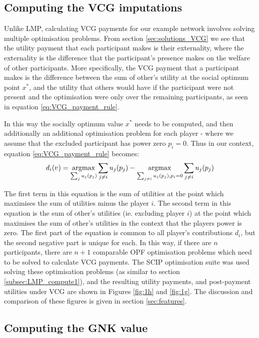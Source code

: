 \subsection{Computing the VCG imputations}\label{subsec:VCG_compute1}

Unlike LMP, calculating VCG payments for our example network involves solving multiple optimisation problems.
From section \ref{sec:solutions_VCG} we see that the utility payment that each participant makes is their externality, where the externality is the difference that the participant's presence makes on the welfare of other participants.
More specifically, the VCG payment that a participant makes is the difference between the sum of other's utility at the social optimum point $x^*$, and the utility that others would have if the participant were not present and the optimisation were only over the remaining participants, as seen in equation \ref{eq:VCG_payment_rule}.

In this way the socially optimum value $x^*$ needs to be computed, and then additionally an additional optimisation problem for each player - where we assume that the excluded participant has power zero $p_i=0$. Thus in our context, equation \ref{eq:VCG_payment_rule} becomes:
\begin{equation*} d_i(v)=\operatorname*{\arg\!\max}_{\sum_{j} u_j(p_j)}\sum_{j\ne i}u_j(p_j) - \operatorname*{\arg\!\max}_{\sum_{j\ne i} u_j(p_j), p_i=0}\sum_{j\ne i}u_j(p_j)\end{equation*}

The first term in this equation is the sum of utilities at the point which maximises the sum of utilities minus the player $i$.
The second term in this equation is the sum of other's utilities (ie. excluding player $i$) at the point which maximises the sum of other's utilities in the context that the players power is zero.
The first part of the equation is common to all player's contributions $d_i$, but the second negative part is unique for each.
In this way, if there are $n$ participants, there are $n+1$ comparable OPF optimisation problems which need to be solved to calculate VCG payments.
The SCIP optimisation suite was used solving these optimisation problems (as similar to section \ref{subsec:LMP_compute1}), and the resulting utility payments, and post-payment utilities under VCG are shown in Figures \ref{fig:1h} and \ref{fig:1g}.
The discussion and comparison of these figures is given in section \ref{sec:features}.


\subsection{Computing the GNK value}\label{subsec:gnk_compute1}

